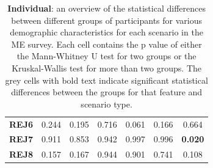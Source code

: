 \begin{table}
\begin{tabular}{lccc|ccc}
        \textbf{REJ6} & 0.244                                   & 0.195                                             & 0.716                                  & 0.061                                    & 0.166                                  & 0.664                                  \\
        \textbf{REJ7} & 0.911                                   & 0.853                                             & 0.942                                  & 0.997                                    & 0.996                                  & \cellcolor[HTML]{EFEFEF}\textbf{0.020} \\
        \textbf{REJ8} & 0.157                                   & 0.167                                             & 0.944                                  & 0.901                                    & 0.741                                  & 0.108                                  \\
        \bottomrule
    \end{tabular}
    \caption{\textbf{Individual}: an overview of the statistical differences between different groups of participants for various demographic characteristics for each scenario in the ME survey. Each cell contains the p value of either the Mann-Whitney U test for two groups or the Kruskal-Wallis test for more than two groups. The grey cells with bold text indicate significant statistical differences between the groups for that feature and scenario type.}
    \label{tab:results-differences-ind}
\end{table}

